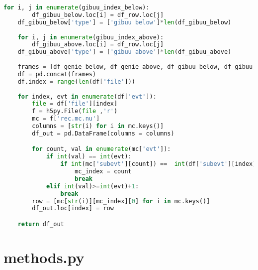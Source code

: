 \begin{lstlisting}[language=Python]
    for i, j in enumerate(gibuu_index_below):
        df_gibuu_below.loc[i] = df_row.loc[j]
	df_gibuu_below['type'] = ['gibuu below']*len(df_gibuu_below)
	
    for i, j in enumerate(gibuu_index_above):
        df_gibuu_above.loc[i] = df_row.loc[j]
	df_gibuu_above['type'] = ['gibuu above']*len(df_gibuu_above)
	
    frames = [df_genie_below, df_genie_above, df_gibuu_below, df_gibuu_above]
    df = pd.concat(frames)
    df.index = range(len(df['file']))
	
    for index, evt in enumerate(df['evt']):
        file = df['file'][index]
        f = h5py.File(file ,'r')
        mc = f['rec.mc.nu']
        columns = [str(i) for i in mc.keys()]
        df_out = pd.DataFrame(columns = columns)

        for count, val in enumerate(mc['evt']):
            if int(val) == int(evt):
                if int(mc['subevt'][count]) ==  int(df['subevt'][index]):
                    mc_index = count
                    break
            elif int(val)>=int(evt)+1:
                break
        row = [mc[str(i)][mc_index][0] for i in mc.keys()]
        df_out.loc[index] = row

    return df_out

\end{lstlisting}

\section*{methods.py}

